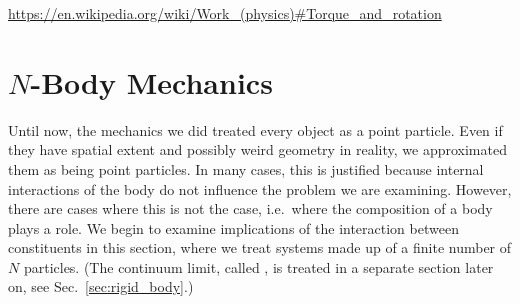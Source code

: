 \documentclass[../class_mech_main.tex]{subfiles}
\begin{document}
 \url{https://en.wikipedia.org/wiki/Work_(physics)#Torque_and_rotation}



	\section{$N$-Body Mechanics}
	\label{sec:n_body_mechanics}
Until now, the mechanics we did treated every object as a point particle. Even if they have spatial extent and possibly weird geometry in reality, we approximated them as being point particles. In many cases, this is justified because internal interactions of the body do not influence the problem we are examining. However, there are cases where this is not the case, i.e.~where the composition of a body plays a role. We begin to examine implications of the interaction between constituents in this section, where we treat systems made up of a finite number of $N$ particles. (The continuum limit, called , is treated in a separate section later on, see Sec.~\ref{sec:rigid_body}.)


\end{document}
